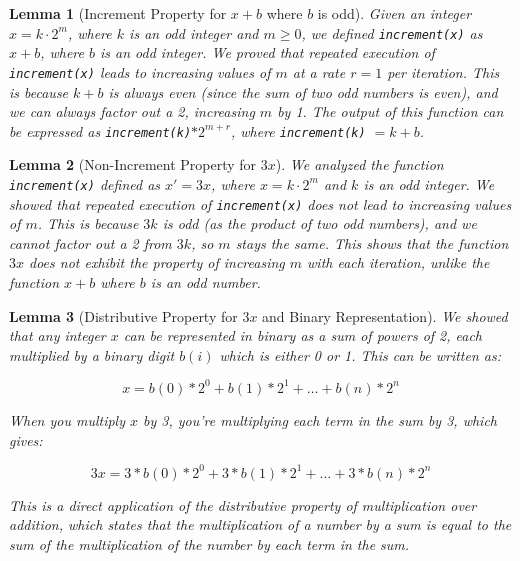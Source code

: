 \documentclass{article}
\newtheorem{lemma}{Lemma}
\begin{document}
\begin{lemma}[Increment Property for $x + b$ where $b$ is odd]
    Given an integer $x = k \cdot 2^m$, where $k$ is an odd integer and $m \geq 0$, we defined \texttt{increment(x)} as $x + b$, where $b$ is an odd integer. We proved that repeated execution of \texttt{increment(x)} leads to increasing values of $m$ at a rate $r = 1$ per iteration. This is because $k + b$ is always even (since the sum of two odd numbers is even), and we can always factor out a 2, increasing $m$ by 1. The output of this function can be expressed as \texttt{increment(k)}$*2^{m+r}$, where \texttt{increment(k)} $= k + b$.
    \end{lemma}

\begin{lemma}[Non-Increment Property for $3x$]
    We analyzed the function \texttt{increment(x)} defined as $x' = 3x$, where $x = k \cdot 2^m$ and $k$ is an odd integer. We showed that repeated execution of \texttt{increment(x)} does not lead to increasing values of $m$. This is because $3k$ is odd (as the product of two odd numbers), and we cannot factor out a 2 from $3k$, so $m$ stays the same. This shows that the function $3x$ does not exhibit the property of increasing $m$ with each iteration, unlike the function $x + b$ where $b$ is an odd number.
    \end{lemma}
        

\begin{lemma}[Distributive Property for $3x$ and Binary Representation]
    We showed that any integer $x$ can be represented in binary as a sum of powers of 2, each multiplied by a binary digit $b(i)$ which is either 0 or 1. This can be written as:
    
    \[x = b(0)*2^0 + b(1)*2^1 + \ldots + b(n)*2^n\]
    
    When you multiply $x$ by 3, you're multiplying each term in the sum by 3, which gives:
    
    \[3x = 3*b(0)*2^0 + 3*b(1)*2^1 + \ldots + 3*b(n)*2^n\]
    
    This is a direct application of the distributive property of multiplication over addition, which states that the multiplication of a number by a sum is equal to the sum of the multiplication of the number by each term in the sum.
    \end{lemma}
        
\end{document}
